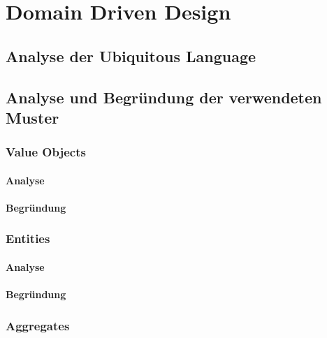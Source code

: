 
\chapter{Domain Driven Design}

\section{Analyse der Ubiquitous Language}

\section{Analyse und Begründung der verwendeten Muster}

	\subsection{Value Objects}

		\subsubsection{Analyse}

		\subsubsection{Begründung}

	\subsection{Entities}

		\subsubsection{Analyse}

		\subsubsection{Begründung}

	\subsection{Aggregates}

